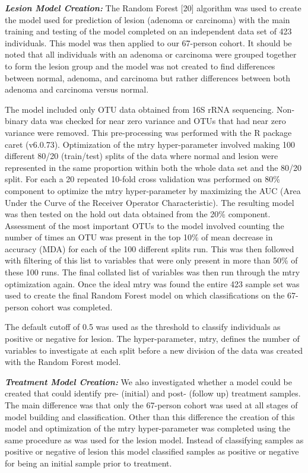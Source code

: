 \documentclass[12pt,]{article}
\begin{document}
\textbf{\emph{Lesion Model Creation:}} The Random Forest {[}20{]}
algorithm was used to create the model used for prediction of lesion
(adenoma or carcinoma) with the main training and testing of the model
completed on an independent data set of 423 individuals. This model was
then applied to our 67-person cohort. It should be noted that all
individuals with an adenoma or carcinoma were grouped together to form
the lesion group and the model was not created to find differences
between normal, adenoma, and carcinoma but rather differences between
both adenoma and carcinoma versus normal.

The model included only OTU data obtained from 16S rRNA sequencing.
Non-binary data was checked for near zero variance and OTUs that had
near zero variance were removed. This pre-processing was performed with
the R package caret (v6.0.73). Optimization of the mtry hyper-parameter
involved making 100 different 80/20 (train/test) splits of the data
where normal and lesion were represented in the same proportion within
both the whole data set and the 80/20 split. For each a 20 repeated
10-fold cross validation was performed on 80\% component to optimize the
mtry hyper-parameter by maximizing the AUC (Area Under the Curve of the
Receiver Operator Characteristic). The resulting model was then tested
on the hold out data obtained from the 20\% component. Assessment of the
most important OTUs to the model involved counting the number of times
an OTU was present in the top 10\% of mean decrease in accuracy (MDA)
for each of the 100 different splits run. This was then followed with
filtering of this list to variables that were only present in more than
50\% of these 100 runs. The final collated list of variables was then
run through the mtry optimization again. Once the ideal mtry was found
the entire 423 sample set was used to create the final Random Forest
model on which classifications on the 67-person cohort was completed.

The default cutoff of 0.5 was used as the threshold to classify
individuals as positive or negative for lesion. The hyper-parameter,
mtry, defines the number of variables to investigate at each split
before a new division of the data was created with the Random Forest
model.

\textbf{\emph{Treatment Model Creation:}} We also investigated whether a
model could be created that could identify pre- (initial) and post-
(follow up) treatment samples. The main difference was that only the
67-person cohort was used at all stages of model building and
classification. Other than this difference the creation of this model
and optimization of the mtry hyper-parameter was completed using the
same procedure as was used for the lesion model. Instead of classifying
samples as positive or negative of lesion this model classified samples
as positive or negative for being an initial sample prior to treatment.
\end{document}

